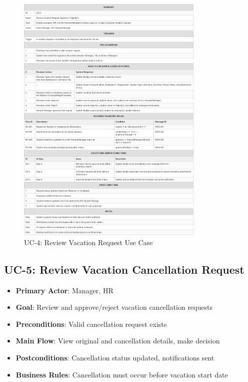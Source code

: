 \documentclass[12pt,a4paper]{article}
\begin{document}
\begin{figure}[H]
\centering
\includegraphics[width=0.8\textwidth]{Use-Cases/UC-4-Review-Vacation-Request/UC-4-Review-Vacation-Request-1.png}
\caption{UC-4: Review Vacation Request Use Case}
\label{fig:uc4}
\end{figure}

\subsection{UC-5: Review Vacation Cancellation Request}
\begin{itemize}
    \item \textbf{Primary Actor}: Manager, HR
    \item \textbf{Goal}: Review and approve/reject vacation cancellation requests
    \item \textbf{Preconditions}: Valid cancellation request exists
    \item \textbf{Main Flow}: View original and cancellation details, make decision
    \item \textbf{Postconditions}: Cancellation status updated, notifications sent
    \item \textbf{Business Rules}: Cancellation must occur before vacation start date
\end{itemize}
\end{document}
